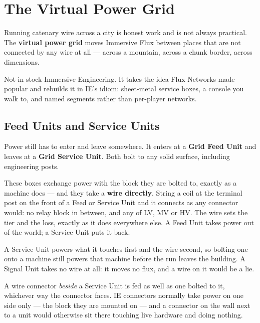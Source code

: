 \chapter{The Virtual Power Grid}
\label{ch:grid}

Running catenary wire across a city is honest work and is not always practical. The
\textbf{virtual power grid} moves Immersive Flux between places that are not connected by any wire
at all --- across a mountain, across a chunk border, across dimensions.

\begin{iefork}
Not in stock Immersive Engineering. It takes the idea Flux Networks made popular and rebuilds it in
IE's idiom: sheet-metal service boxes, a console you walk to, and named segments rather than
per-player networks.
\end{iefork}

\section{Feed Units and Service Units}

Power still has to enter and leave somewhere. It enters at a \textbf{Grid Feed Unit} and leaves at a
\textbf{Grid Service Unit}. Both bolt to any solid surface, including engineering posts.

These boxes exchange power with the block they are bolted to, exactly as a machine does --- and
they take a \textbf{wire directly}. String a coil at the terminal post on the front of a Feed or
Service Unit and it connects as any connector would: no relay block in between, and any of LV, MV
or HV. The wire sets the tier and the loss, exactly as it does everywhere else. A Feed Unit takes
power out of the world; a Service Unit puts it back.

A Service Unit powers what it touches first and the wire second, so bolting one onto a machine still
powers that machine before the run leaves the building. A Signal Unit takes no wire at all: it moves
no flux, and a wire on it would be a lie.

\begin{ietip}
A wire connector \emph{beside} a Service Unit is fed as well as one bolted to it, whichever way the
connector faces. IE connectors normally take power on one side only --- the block they are mounted
on --- and a connector on the wall next to a unit would otherwise sit there touching live hardware
and doing nothing.
\end{ietip}

